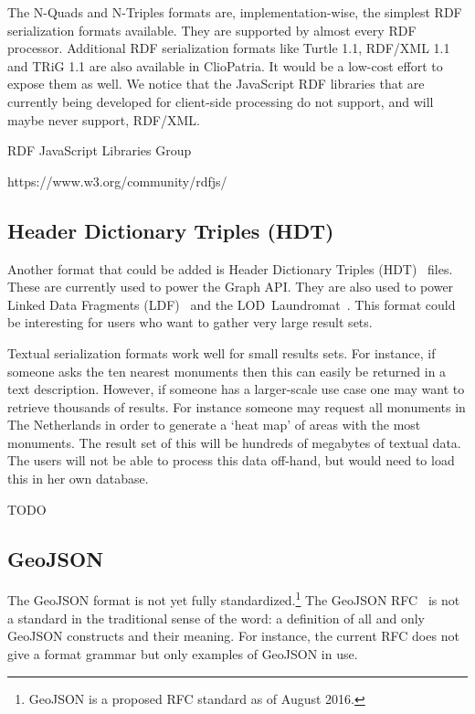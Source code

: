 \documentclass[a4paper]{scrartcl}
\begin{document}
The N-Quads and N-Triples formats are, implementation-wise, the
simplest RDF serialization formats available.  They are supported by
almost every RDF processor.  Additional RDF serialization formats like
Turtle 1.1, RDF/XML 1.1 and TRiG 1.1 are also available in ClioPatria.
It would be a low-cost effort to expose them as well.  We notice that
the JavaScript RDF libraries that are currently being developed for
client-side processing do not support, and will maybe never support,
RDF/XML.

RDF JavaScript Libraries Group

https://www.w3.org/community/rdfjs/


\subsection{Header Dictionary Triples (HDT)}
\label{sec:hdt}

Another format that could be added is Header Dictionary Triples
(HDT)~\cite{Fernandez2012} files.  These are currently used to power
the Graph API.  They are also used to power Linked Data Fragments
(LDF)~\cite{Verborgh2014} and the LOD~Laundromat~\cite{Beek2014}.
This format could be interesting for users who want to gather very
large result sets.

Textual serialization formats work well for small results sets.  For
instance, if someone asks the ten nearest monuments then this can
easily be returned in a text description.  However, if someone has a
larger-scale use case one may want to retrieve thousands of results.
For instance someone may request all monuments in The Netherlands in
order to generate a `heat map' of areas with the most monuments.  The
result set of this will be hundreds of megabytes of textual data.  The
users will not be able to process this data off-hand, but would need
to load this in her own database.

TODO


\subsection{GeoJSON}
\label{sec:geojson}

The GeoJSON format is not yet fully standardized.\footnote{GeoJSON is
  a proposed RFC standard as of August 2016.}  The GeoJSON
RFC~\cite{rfc7946} is not a standard in the traditional sense of the
word: a definition of all and only GeoJSON constructs and their
meaning.  For instance, the current RFC does not give a format grammar
but only examples of GeoJSON in use.
\end{document}
